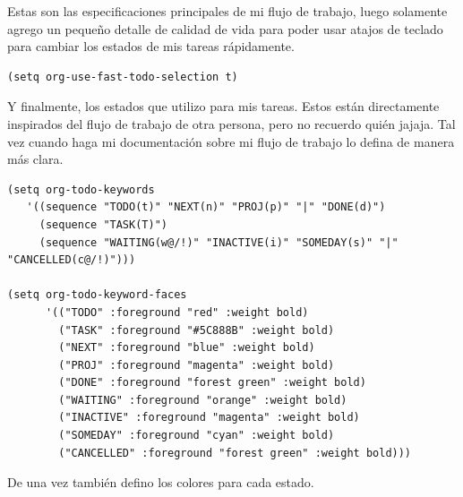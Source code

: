 \documentclass[11pt]{article}
\begin{document}
Estas son las especificaciones principales de mi flujo de trabajo, luego solamente agrego un pequeño detalle de calidad de vida para poder usar atajos de teclado para cambiar los estados de mis tareas rápidamente.

\begin{verbatim}
(setq org-use-fast-todo-selection t)
\end{verbatim}

Y finalmente, los estados que utilizo para mis tareas. Estos están directamente inspirados del flujo de trabajo de otra persona, pero no recuerdo quién jajaja. Tal vez cuando haga mi documentación sobre mi flujo de trabajo lo defina de manera más clara.

\begin{verbatim}
(setq org-todo-keywords
   '((sequence "TODO(t)" "NEXT(n)" "PROJ(p)" "|" "DONE(d)")
	 (sequence "TASK(T)")
	 (sequence "WAITING(w@/!)" "INACTIVE(i)" "SOMEDAY(s)" "|" "CANCELLED(c@/!)")))

(setq org-todo-keyword-faces
      '(("TODO" :foreground "red" :weight bold)
	    ("TASK" :foreground "#5C888B" :weight bold)
	    ("NEXT" :foreground "blue" :weight bold)
	    ("PROJ" :foreground "magenta" :weight bold)
	    ("DONE" :foreground "forest green" :weight bold)
	    ("WAITING" :foreground "orange" :weight bold)
	    ("INACTIVE" :foreground "magenta" :weight bold)
	    ("SOMEDAY" :foreground "cyan" :weight bold)
	    ("CANCELLED" :foreground "forest green" :weight bold)))
\end{verbatim}

De una vez también defino los colores para cada estado.
\end{document}
